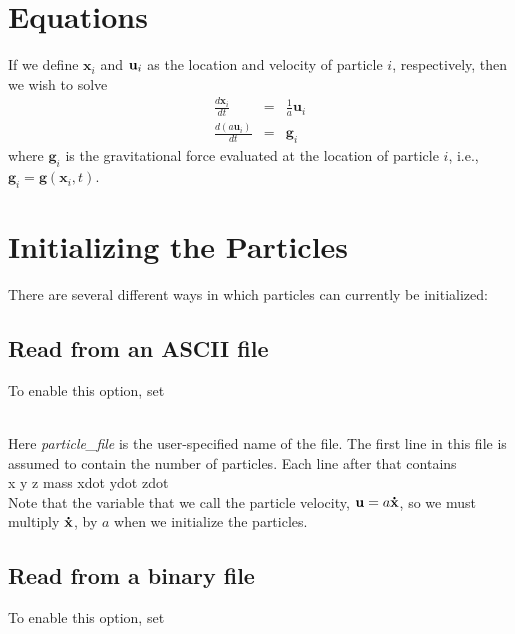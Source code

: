 \section{Equations}

If we define ${\mathbf x}_i$ and ${\bf u}_i$ as the location and velocity of particle $i$, respectively, then we wish
to solve
\begin{eqnarray}
\frac{d {\mathbf x}_i}{d t} &=& \frac{1}{a} {\mathbf u}_i \\
\frac{d (a {\mathbf u}_i) }{d t} &=& {\mathbf g}_i
\end{eqnarray}
where ${\mathbf g}_i$ is the gravitational force evaluated at the location of particle $i$, i.e., 
${\mathbf g}_i = {\mathbf g}({\mathbf x}_i,t).$

\section{Initializing the Particles}

\noindent There are several different ways in which particles can currently be initialized:

\subsection{Read from an ASCII file}

To enable this option, set \\

 \\

Here {\em particle\_file} is the user-specified name of the file.  The first line in this file is
assumed to contain the number of particles.  Each line after that contains  \\

x y z mass xdot ydot zdot \\

Note that the variable that we call the particle velocity, ${\mathbf u} = a {\bf \dot{x}}$, 
so we must multiply ${\bf \dot{x}}$, by $a$ when we initialize the particles.

\subsection{Read from a binary file}

To enable this option, set \\


